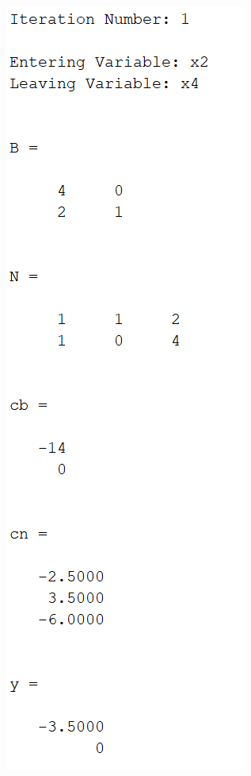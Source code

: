 \documentclass{article}
\begin{document}
\begin{itemize}
\begin{itemize}
\begin{center}
            \includegraphics[scale = 0.65]{iteration1Prob1}

\end{center}
\end{itemize}
\end{itemize}
\end{document}

